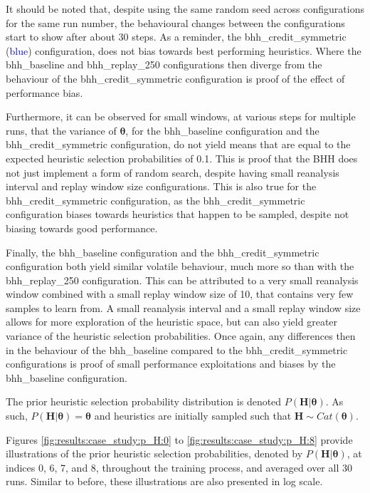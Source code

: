 It should be noted that, despite using the same random seed across configurations for the same run number, the behavioural changes between the configurations start to show after about 30 steps. As a reminder, the bhh\_credit\_symmetric (\textcolor{blue}{blue}) configuration, does not bias towards best performing heuristics. Where the bhh\_baseline and bhh\_replay\_250 configurations then diverge from the behaviour of the bhh\_credit\_symmetric configuration is proof of the effect of performance bias.

Furthermore, it can be observed for small windows, at various steps for multiple runs, that the variance of $\boldsymbol{\theta}$, for the bhh\_baseline configuration and the bhh\_credit\_symmetric configuration, do not yield means that are equal to the expected heuristic selection probabilities of 0.1. This is proof that the \acs{BHH} does not just implement a form of random search, despite having small reanalysis interval and replay window size configurations. This is also true for the bhh\_credit\_symmetric configuration, as the bhh\_credit\_symmetric configuration biases towards heuristics that happen to be sampled, despite not biasing towards good performance.

Finally, the bhh\_baseline configuration and the bhh\_credit\_symmetric configuration both yield similar volatile behaviour, much more so than with the bhh\_replay\_250 configuration. This can be attributed to a very small reanalysis window combined with a small replay window size of 10, that contains very few samples to learn from. A small reanalysis interval and a small replay window size allows for more exploration of the heuristic space, but can also yield greater variance of the heuristic selection probabilities. Once again, any differences then in the behaviour of the bhh\_baseline compared to the bhh\_credit\_symmetric configurations is proof of small performance exploitations and biases by the bhh\_baseline configuration.

The prior heuristic selection probability distribution is denoted $P(\boldsymbol{H} \vert \boldsymbol{\theta})$. As such, $P(\boldsymbol{H} \vert \boldsymbol{\theta}) = \boldsymbol{\theta}$ and heuristics are initially sampled such that $\boldsymbol{H} \sim Cat(\boldsymbol{\theta})$.

Figures \ref{fig:results:case_study:p_H:0} to \ref{fig:results:case_study:p_H:8} provide illustrations of the prior heuristic selection probabilities, denoted by $P(\boldsymbol{H} \vert \boldsymbol{\theta})$, at indices 0, 6, 7, and 8, throughout the training process, and averaged over all 30 runs. Similar to before, these illustrations are also presented in log scale.

